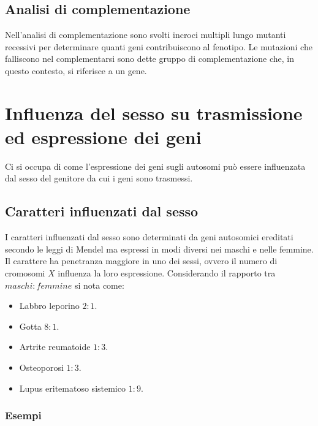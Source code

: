 \subsection{Analisi di complementazione}
Nell'analisi di complementazione sono svolti incroci multipli lungo mutanti recessivi per determinare quanti geni contribuiscono al fenotipo. Le mutazioni che falliscono nel 
complementarsi sono dette gruppo di complementazione che, in questo contesto, si riferisce a un gene. 
\section{Influenza del sesso su trasmissione ed espressione dei geni}
Ci si occupa di come l'espressione dei geni sugli autosomi pu\`o essere influenzata dal sesso del genitore da cui i geni sono trasmessi.
\subsection{Caratteri influenzati dal sesso}
I caratteri influenzati dal sesso sono determinati da geni autosomici ereditati secondo le leggi di Mendel ma espressi in modi diversi nei maschi e nelle femmine. Il carattere ha penetranza maggiore in
uno dei sessi, ovvero il numero di cromosomi $X$ influenza la loro espressione. Considerando il rapporto tra $maschi:femmine$ si nota come:
\begin{multicols}{2}
\begin{itemize}
	\item Labbro leporino $2:1$.
	\item Gotta $8:1$.
	\item Artrite reumatoide $1:3$.
	\item Osteoporosi $1:3$.
	\item Lupus eritematoso sistemico $1:9$.
\end{itemize}
\end{multicols}
\subsubsection{Esempi}
